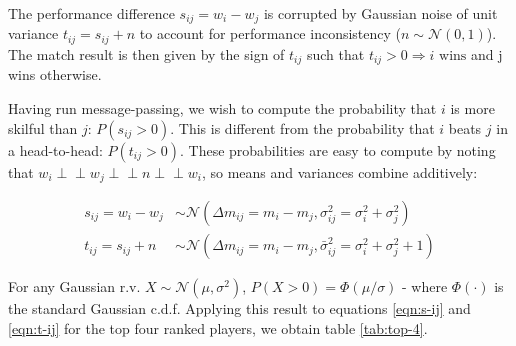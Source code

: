 \documentclass[]{article}
\newcommand{\Ncal}{\mathcal{N}}
\newcommand{\indep}{\perp \!\!\! \perp}
\begin{document}
The performance difference $s_{ij} = w_i - w_j$ is corrupted by Gaussian noise of unit variance $t_{ij} = s_{ij} + n$ to account for performance inconsistency ($n \sim \Ncal(0, 1)$). The match result is then given by the sign of $t_{ij}$ such that $t_{ij} > 0 \Rightarrow i \text{ wins}$ and j wins otherwise.

Having run message-passing, we wish to compute the probability that $i$ is more skilful than $j$: $P(s_{ij} > 0)$. This is different from the probability that $i$ beats $j$ in a head-to-head: $P(t_{ij} > 0)$. These probabilities are easy to compute by noting that $w_i \indep w_j \indep n \indep w_i$, so means and variances combine additively:

\begin{align}
		s_{ij} = w_i - w_j &\sim \Ncal(\Delta m_{ij} = m_i - m_j, \sigma_{ij}^2 = \sigma_i^2 + \sigma_j^2)
		\label{eqn:s-ij} \\	
		t_{ij} = s_{ij} + n &\sim \Ncal(\Delta m_{ij} = m_i - m_j, \bar{\sigma}_{ij}^2 = \sigma_i^2 + \sigma_j^2 + 1)
		\label{eqn:t-ij}
\end{align}

For any Gaussian r.v. $X \sim \Ncal(\mu, \sigma^2)$, $P(X > 0) = \Phi(\mu / \sigma)$ - where $\Phi(\cdot)$ is the standard Gaussian c.d.f. Applying this result to equations \ref{eqn:s-ij} and \ref{eqn:t-ij} for the top four ranked players, we obtain table \ref{tab:top-4}.
\end{document}
